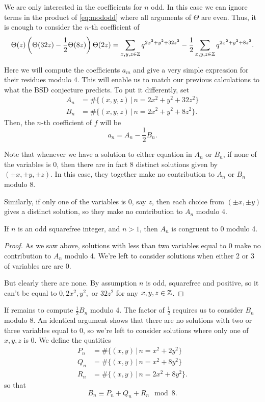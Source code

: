 \documentclass[12pt, a4paper]{report}
\begin{document}
We are only interested in the coefficients for $n$ odd. In this case we can
ignore terms in the product of \autoref{eq:mododd} where all arguments of
$\Theta$ are even. Thus, it is enough to
consider the $n$-th coefficient of
\[
  \Theta(z) \left( \Theta(32z) - \frac{1}{2} \Theta(8z) \right)\Theta(2z) =
  \sum\limits_{x, y, z \in {\mathbb Z}} q^{2x^2+y^2+32z^2} - \frac{1}{2}
  \sum\limits_{x,y,z \in {\mathbb Z}} q^{2x^2+y^2+8z^2}.
\]

Here we will compute the coefficients $a_m$ and give a very simple expression for
their residues modulo 4. This will enable us to match our previous calculations
to what the BSD conjecture predicts.
To put it differently, set
\begin{equation*}
  \begin{split}
    A_n &= \#\{(x,y,z) \,|\, n = 2x^2 + y^2 + 32z^2\} \\
    B_n &= \#\{(x,y,z) \,|\, n = 2x^2 + y^2 + 8z^2\}.
  \end{split}
\end{equation*}
Then, the $n$-th coefficient of $f$ will be
\[a_n = A_n - \frac{1}{2}B_n.\]

Note that whenever we have a solution to either equation in $A_n$ or $B_n$,
if none of the variables is 0, then there are in fact 8 distinct
solutions given by $(\pm x, \pm y, \pm z)$.
In this case, they together make no contribution to $A_n$ or $B_n$ modulo 8.

Similarly, if only one of the variables is 0, say $z$, then each choice from
$(\pm x, \pm y)$ gives a distinct solution, so they make no contribution
to $A_n$ modulo 4.

\begin{lemma}
  If $n$ is an odd squarefree integer, and $n > 1$,
  then $A_n$ is congruent to 0 modulo 4.
\end{lemma}
\begin{proof}
  As we saw above, solutions with less than two variables equal to 0 make no
  contribution to $A_n$ modulo 4. We're left to consider solutions when
  either 2 or 3 of variables are are 0.

  But clearly there are none. By assumption $n$ is odd, squarefree and
  positive, so it can't be equal to $0, 2x^2, y^2, $ or $32z^2$ for
  any $x,y,z \in {\mathbb Z}$.
\end{proof}

If remains to compute $\frac{1}{2}B_n$ modulo 4. The factor of $\frac{1}{2}$
requires us to consider $B_n$ modulo 8.
An identical argument shows that there are no solutions with two or three
variables
equal to 0, so
we're left to consider solutions where only one of $x,y,z$ is 0.
We define the quatities
\[
  \begin{split}
    P_n &= \#\{(x,y) \,|\, n = x^2 + 2y^2\} \\
    Q_n &= \#\{(x,y) \,|\, n = x^2 + 8y^2\} \\
    R_n &= \#\{(x,y) \,|\, n = 2x^2 + 8y^2\}.
  \end{split}
\]
so that
\[
  B_n \equiv P_n + Q_n + R_n \mod{8}.
\]
\end{document}
